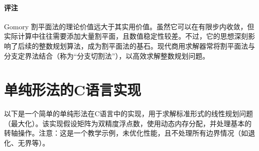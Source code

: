 \documentclass[12pt]{article}
\theoremstyle{plain}
\theoremstyle{definition}
\begin{document}
\paragraph{评注}
Gomory 割平面法的理论价值远大于其实用价值。虽然它可以在有限步内收敛，但实际计算中往往需要添加大量割平面，且数值稳定性较差。不过，它的思想深刻影响了后续的整数规划算法，成为割平面法的基石。现代商用求解器常将割平面法与分支定界法结合（称为“分支切割法”），以高效求解整数规划问题。

\newpage
\appendix
\section{单纯形法的C语言实现}\label{appendix:simplex_c_code}

以下是一个简单的单纯形法在C语言中的实现，用于求解标准形式的线性规划问题（最大化）。该实现假设矩阵为双精度浮点数，使用动态内存分配，并处理基本的转轴操作。注意：这是一个教学示例，未优化性能，且不处理所有边界情况（如退化、无界等）。
\end{document}
